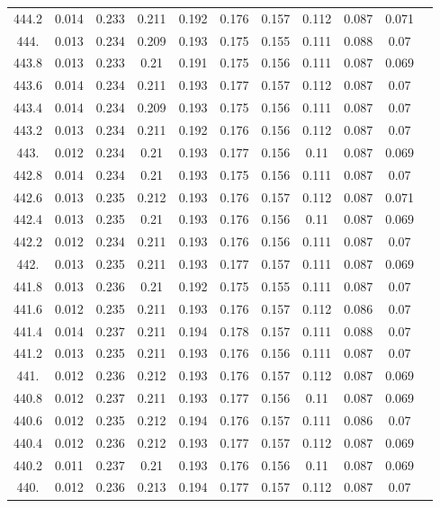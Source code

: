 \documentclass[12pt]{ctexart}
\numberwithin{equation}{section}
\begin{document}
\begin{longtable}{ccccccccccc}
444.2	&	0.014	&	0.233	&	0.211	&	0.192	&	0.176	&	0.157	&	0.112	&	0.087	&	0.071	\\
444.	&	0.013	&	0.234	&	0.209	&	0.193	&	0.175	&	0.155	&	0.111	&	0.088	&	0.07	\\
443.8	&	0.013	&	0.233	&	0.21	&	0.191	&	0.175	&	0.156	&	0.111	&	0.087	&	0.069	\\
443.6	&	0.014	&	0.234	&	0.211	&	0.193	&	0.177	&	0.157	&	0.112	&	0.087	&	0.07	\\
443.4	&	0.014	&	0.234	&	0.209	&	0.193	&	0.175	&	0.156	&	0.111	&	0.087	&	0.07	\\
443.2	&	0.013	&	0.234	&	0.211	&	0.192	&	0.176	&	0.156	&	0.112	&	0.087	&	0.07	\\
443.	&	0.012	&	0.234	&	0.21	&	0.193	&	0.177	&	0.156	&	0.11	&	0.087	&	0.069	\\
442.8	&	0.014	&	0.234	&	0.21	&	0.193	&	0.175	&	0.156	&	0.111	&	0.087	&	0.07	\\
442.6	&	0.013	&	0.235	&	0.212	&	0.193	&	0.176	&	0.157	&	0.112	&	0.087	&	0.071	\\
442.4	&	0.013	&	0.235	&	0.21	&	0.193	&	0.176	&	0.156	&	0.11	&	0.087	&	0.069	\\
442.2	&	0.012	&	0.234	&	0.211	&	0.193	&	0.176	&	0.156	&	0.111	&	0.087	&	0.07	\\
442.	&	0.013	&	0.235	&	0.211	&	0.193	&	0.177	&	0.157	&	0.111	&	0.087	&	0.069	\\
441.8	&	0.013	&	0.236	&	0.21	&	0.192	&	0.175	&	0.155	&	0.111	&	0.087	&	0.07	\\
441.6	&	0.012	&	0.235	&	0.211	&	0.193	&	0.176	&	0.157	&	0.112	&	0.086	&	0.07	\\
441.4	&	0.014	&	0.237	&	0.211	&	0.194	&	0.178	&	0.157	&	0.111	&	0.088	&	0.07	\\
441.2	&	0.013	&	0.235	&	0.211	&	0.193	&	0.176	&	0.156	&	0.111	&	0.087	&	0.07	\\
441.	&	0.012	&	0.236	&	0.212	&	0.193	&	0.176	&	0.157	&	0.112	&	0.087	&	0.069	\\
440.8	&	0.012	&	0.237	&	0.211	&	0.193	&	0.177	&	0.156	&	0.11	&	0.087	&	0.069	\\
440.6	&	0.012	&	0.235	&	0.212	&	0.194	&	0.176	&	0.157	&	0.111	&	0.086	&	0.07	\\
440.4	&	0.012	&	0.236	&	0.212	&	0.193	&	0.177	&	0.157	&	0.112	&	0.087	&	0.069	\\
440.2	&	0.011	&	0.237	&	0.21	&	0.193	&	0.176	&	0.156	&	0.11	&	0.087	&	0.069	\\
440.	&	0.012	&	0.236	&	0.213	&	0.194	&	0.177	&	0.157	&	0.112	&	0.087	&	0.07	\\

\end{longtable}
\end{document}
